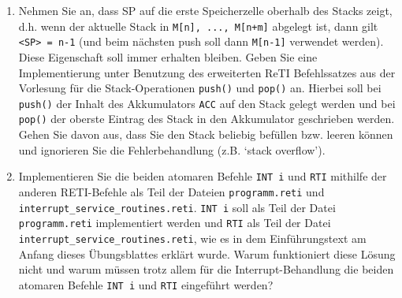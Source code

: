 \documentclass{article}
\begin{document}
\begin{enumerate}[label=\alph*)]
	\item Nehmen Sie an, dass SP auf die erste Speicherzelle oberhalb des Stacks zeigt, d.h. wenn der aktuelle Stack in \verb|M[n], ..., M[n+m]| abgelegt ist, dann gilt \verb|<SP> = n-1| (und beim nächsten push soll dann \verb|M[n-1]| verwendet werden). Diese Eigenschaft soll immer erhalten bleiben. Geben Sie eine Implementierung unter Benutzung des erweiterten ReTI Befehlssatzes aus der Vorlesung für die Stack-Operationen \verb|push()| und \verb|pop()| an. Hierbei soll bei \verb|push()| der Inhalt des Akkumulators \verb|ACC| auf den Stack gelegt werden und bei \verb|pop()| der oberste Eintrag des Stack in den Akkumulator geschrieben werden. Gehen Sie davon aus, dass Sie den Stack beliebig befüllen bzw. leeren können und ignorieren Sie die Fehlerbehandlung (z.B. ‘stack overflow’).
	\item Implementieren Sie die beiden atomaren Befehle \verb|INT i| und \verb|RTI| mithilfe der anderen RETI-Befehle als Teil der Dateien \verb|programm.reti| und \verb|interrupt_service_routines.reti|. \verb|INT i| soll als Teil der Datei \verb|programm.reti| implementiert werden und \verb|RTI| als Teil der Datei \verb|interrupt_service_routines.reti|, wie es in dem Einführungstext am Anfang dieses Übungsblattes erklärt wurde. Warum funktioniert diese Lösung nicht und warum müssen trotz allem für die Interrupt-Behandlung die beiden atomaren Befehle \verb|INT i| und \verb|RTI| eingeführt werden? %
\end{enumerate}
\end{document}
